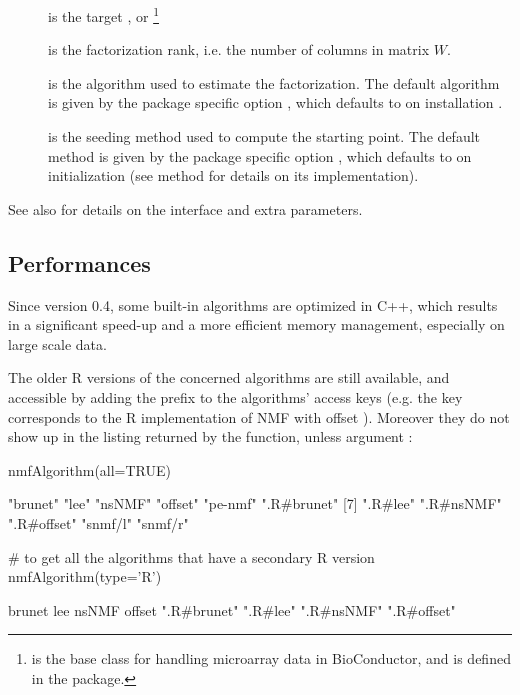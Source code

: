 \documentclass[a4paper]{article}
\begin{document}
\begin{description}
\item[] is the target ,  or 
\footnote{ is the base class for handling microarray data in 
BioConductor, and is defined in the  package.}
\item[] is the factorization rank, i.e. the number of columns in matrix $W$.
\item[] is the algorithm used to estimate the factorization. 
The default algorithm is given by the package specific option , 
which defaults to  on installation \cite{Brunet04}.
\item[] is the seeding method used to compute the starting point. 
The default method is given by the package specific option , 
which defaults to  on initialization (see method  for details 
on its implementation).
\end{description}

See also  for details on the interface and extra parameters.


\subsection{Performances}

Since version 0.4, some built-in algorithms are optimized in C++, which results in a significant speed-up 
and a more efficient memory management, especially on large scale data.

The older R versions of the concerned algorithms are still available, and accessible by adding the prefix 
 to the algorithms' access keys (e.g. the key  corresponds to the R 
implementation of NMF with offset \cite{Badea2008}).
Moreover they do not show up in the listing returned by the  function, unless argument :

\begin{Schunk}
\begin{Sinput}
 nmfAlgorithm(all=TRUE)
\end{Sinput}
\begin{Soutput}
 [1] "brunet"    "lee"       "nsNMF"     "offset"    "pe-nmf"    ".R#brunet"
 [7] ".R#lee"    ".R#nsNMF"  ".R#offset" "snmf/l"    "snmf/r"   
\end{Soutput}
\begin{Sinput}
 # to get all the algorithms that have a secondary R version
 nmfAlgorithm(type='R')
\end{Sinput}
\begin{Soutput}
     brunet         lee       nsNMF      offset 
".R#brunet"    ".R#lee"  ".R#nsNMF" ".R#offset" 
\end{Soutput}
\end{Schunk}
\end{document}
